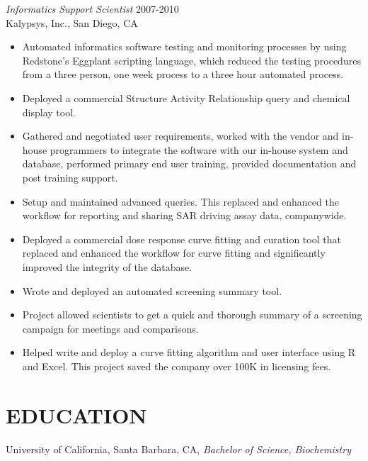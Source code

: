 \documentclass[margin, 10pt]{res} %
\begin{document}
\begin{resume}
{\sl Informatics Support Scientist} \hfill 2007-2010 \\
Kalypsys, Inc., San Diego, CA 
\begin{itemize}
\item Automated informatics software testing and monitoring processes by using Redstone’s Eggplant scripting language, which reduced the testing procedures from a three person, one week process to a three hour automated process.
\item Deployed a commercial Structure Activity Relationship query and chemical display tool.
\item Gathered and negotiated user requirements, worked with the vendor and in-house programmers to integrate the software with our in-house system and database, performed primary end user training, provided documentation and post training support.
\item Setup and maintained advanced queries. This replaced and enhanced the workflow for reporting and sharing SAR driving assay data, companywide.
\item Deployed a commercial dose response curve fitting and curation tool that replaced and enhanced the workflow for curve fitting and significantly improved the integrity of the database.
\item Wrote and deployed an automated screening summary tool.
\item Project allowed scientists to get a quick and thorough summary of a screening campaign for meetings and comparisons.
\item Helped write and deploy a curve fitting algorithm and user interface using R and Excel. This project saved the company over 100K in licensing fees.
\end{itemize} 



\section{EDUCATION}

University of California, Santa Barbara, CA, {\sl Bachelor of Science, Biochemistry}




\end{resume}
\end{document}
